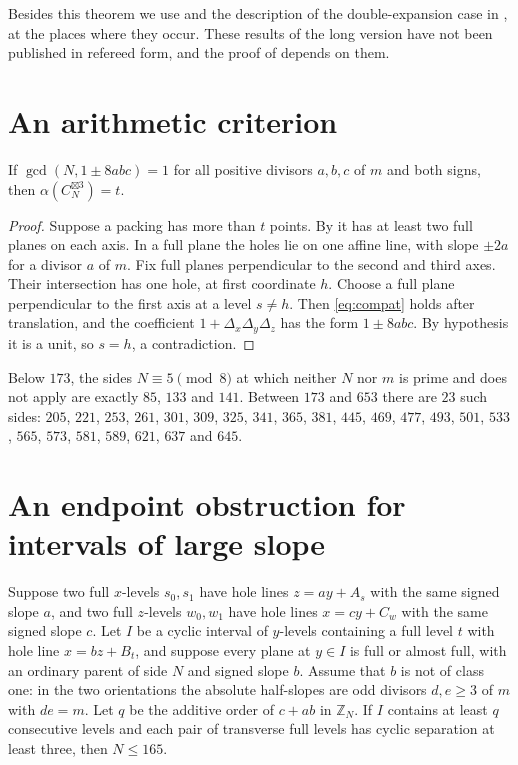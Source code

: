 \documentclass[11pt,colorlinks]{charlie}
\newcommand{\ZN}{\mathbb{Z}_N}
\newcommand{\spow}{\boxtimes}
\begin{document}
Besides this theorem we use \cite[Lemmas~12, 16, 19 and~23]{BHNlong} and the description of the double-expansion case in \cite[Section~3.2.2]{BHNlong}, at the places where they occur. These results of the long version have not been published in refereed form, and the proof of  depends on them.

\section{An arithmetic criterion}\label{sec:arith}

\begin{proposition}\label{prop:arith}
If $\gcd(N,1\pm8abc)=1$ for all positive divisors $a,b,c$ of $m$ and both signs, then $\alpha(C_N^{\spow3})=t$.
\end{proposition}

\begin{proof}
Suppose a packing has more than $t$ points. By \cite[Lemmas~9 and~10]{BHN} it has at least two full planes on each axis. In a full plane the holes lie on one affine line, with slope $\pm2a$ for a divisor $a$ of $m$. Fix full planes perpendicular to the second and third axes. Their intersection has one hole, at first coordinate $h$. Choose a full plane perpendicular to the first axis at a level $s\ne h$. Then \eqref{eq:compat} holds after translation, and the coefficient $1+\Delta_x\Delta_y\Delta_z$ has the form $1\pm8abc$. By hypothesis it is a unit, so $s=h$, a contradiction.
\end{proof}

\begin{remark}
Below $173$, the sides $N\equiv5\pmod8$ at which neither $N$ nor $m$ is prime and  does not apply are exactly $85$, $133$ and $141$. Between $173$ and $653$ there are $23$ such sides: $205$, $221$, $253$, $261$, $301$, $309$, $325$, $341$, $365$, $381$, $445$, $469$, $477$, $493$, $501$, $533$, $565$, $573$, $581$, $589$, $621$, $637$ and $645$.
\end{remark}

\section{An endpoint obstruction for intervals of large slope}\label{sec:endpoint}

\begin{proposition}\label{prop:endpoint}
Suppose two full $x$-levels $s_0,s_1$ have hole lines $z=ay+A_s$ with the same signed slope $a$, and two full $z$-levels $w_0,w_1$ have hole lines $x=cy+C_w$ with the same signed slope $c$. Let $I$ be a cyclic interval of $y$-levels containing a full level $t$ with hole line $x=bz+B_t$, and suppose every plane at $y\in I$ is full or almost full, with an ordinary parent of side $N$ and signed slope $b$. Assume that $b$ is not of class one: in the two orientations the absolute half-slopes are odd divisors $d,e\ge3$ of $m$ with $de=m$. Let $q$ be the additive order of $c+ab$ in $\ZN$. If $I$ contains at least $q$ consecutive levels and each pair of transverse full levels has cyclic separation at least three, then $N\le165$.
\end{proposition}
\end{document}
